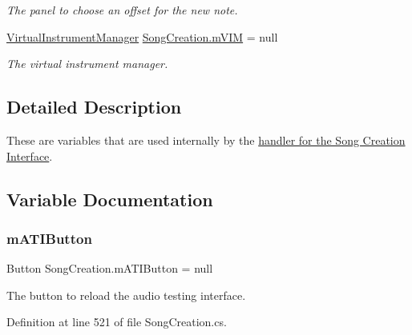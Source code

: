 \begin{DoxyCompactItemize}
\begin{DoxyCompactList}\small\item\em The panel to choose an offset for the new note. \end{DoxyCompactList}\item 
\hyperlink{class_virtual_instrument_manager}{Virtual\+Instrument\+Manager} \hyperlink{group___s_c_priv_var_ga1bad472098eec4194c5b18e7b3ccfd94}{Song\+Creation.\+m\+V\+IM} = null
\begin{DoxyCompactList}\small\item\em The virtual instrument manager. \end{DoxyCompactList}\end{DoxyCompactItemize}


\subsection{Detailed Description}
These are variables that are used internally by the \hyperlink{group___doc_s_c}{handler for the Song Creation Interface}. 

\subsection{Variable Documentation}
\mbox{\label{group___s_c_priv_var_gacc018689b7f6508762958c3796a68937}} 
\subsubsection{\texorpdfstring{m\+A\+T\+I\+Button}{mATIButton}}
{\footnotesize\ttfamily Button Song\+Creation.\+m\+A\+T\+I\+Button = null\hspace{0.3cm}{\ttfamily [private]}}



The button to reload the audio testing interface. 



Definition at line 521 of file Song\+Creation.\+cs.

\mbox{\label{group___s_c_priv_var_ga6f751fe7fc31196eeec490cdbc679baa}} 
